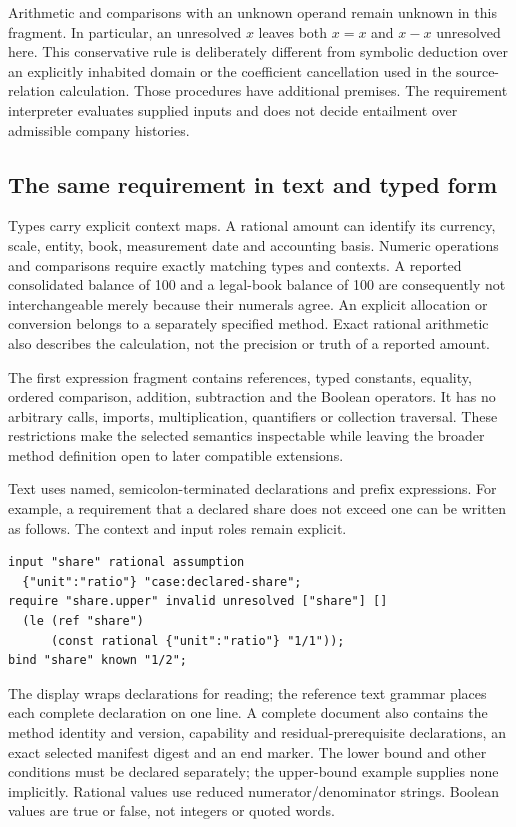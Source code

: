 Arithmetic and comparisons with an unknown operand remain unknown in this
fragment. In particular, an unresolved $x$ leaves both $x=x$ and $x-x$ unresolved
here. This conservative rule is deliberately different from symbolic deduction
over an explicitly inhabited domain or the coefficient cancellation used in the
source-relation calculation. Those procedures have additional premises. The
requirement interpreter evaluates supplied inputs and does not decide entailment
over admissible company histories.

\subsection{The same requirement in text and typed form}

Types carry explicit context maps. A rational amount can identify its currency,
scale, entity, book, measurement date and accounting basis. Numeric operations
and comparisons require exactly matching types and contexts. A reported
consolidated balance of 100 and a legal-book balance of 100 are consequently not
interchangeable merely because their numerals agree. An explicit allocation or
conversion belongs to a separately specified method. Exact rational arithmetic
also describes the calculation, not the precision or truth of a reported amount.

The first expression fragment contains references, typed constants, equality,
ordered comparison, addition, subtraction and the Boolean operators. It has no
arbitrary calls, imports, multiplication, quantifiers or collection traversal.
These restrictions make the selected semantics inspectable while leaving the
broader method definition open to later compatible extensions.

\noindent\begin{minipage}{\linewidth}
Text uses named, semicolon-terminated declarations and prefix expressions. For
example, a requirement that a declared share does not exceed one can be written
as follows. The context and input roles remain explicit.
\begin{lstlisting}
input "share" rational assumption
  {"unit":"ratio"} "case:declared-share";
require "share.upper" invalid unresolved ["share"] []
  (le (ref "share")
      (const rational {"unit":"ratio"} "1/1"));
bind "share" known "1/2";
\end{lstlisting}
\end{minipage}

The display wraps declarations for reading; the reference text grammar places
each complete declaration on one line. A complete document also contains the
method identity and version, capability and residual-prerequisite declarations,
an exact selected manifest digest and an end marker. The lower bound and other
conditions must be declared separately; the upper-bound example supplies none
implicitly. Rational values use reduced numerator/denominator strings. Boolean
values are true or false, not integers or quoted words.

